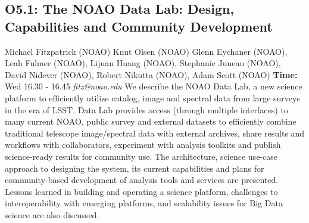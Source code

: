 \documentclass{report}
\begin{document}
\subsection*{O5.1: The NOAO Data Lab: Design, Capabilities and Community Development}
\bigskip
Michael Fitzpatrick (NOAO) \newline Knut Olsen (NOAO) \newline   \newline   \newline  \newline  Glenn Eychaner (NOAO), Leah Fulmer (NOAO), Lijuan Huang (NOAO), Stephanie Juneau (NOAO), David Nidever (NOAO), Robert Nikutta (NOAO), Adam Scott (NOAO)\newline\newline
{\bf Time:} Wed 16.30 - 16.45\newline
\newline
{\it fitz@noao.edu}\newline
\newline\newline
We describe the NOAO Data Lab, a new science platform to efficiently
utilize catalog, image and spectral data from large surveys in the era of LSST.
Data Lab provides access (through multiple interfaces) to many current NOAO,
public survey and external datasets to efficiently combine traditional
telescope image/spectral data with external archives, share results and
workflows with collaborators, experiment with analysis toolkits and publish
science-ready results for community use.  The architecture, science use-case
approach to designing the system, its current capabilities and plans for
community-based development of analysis tools and services are presented.
Lessons learned in building and operating a science platform, challenges to
interoperability with emerging platforms, and scalability issues for Big Data
science are also discussed.\newline
\newpage
\end{document}
